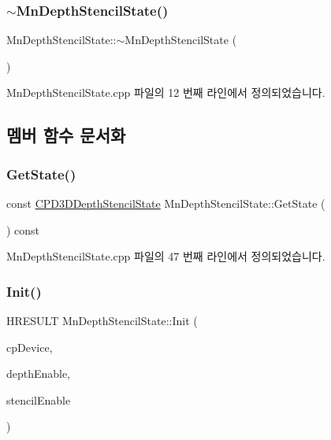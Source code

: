 \subsubsection{\texorpdfstring{$\sim$\+Mn\+Depth\+Stencil\+State()}{~MnDepthStencilState()}}
{\footnotesize\ttfamily Mn\+Depth\+Stencil\+State\+::$\sim$\+Mn\+Depth\+Stencil\+State (\begin{DoxyParamCaption}{ }\end{DoxyParamCaption})}



Mn\+Depth\+Stencil\+State.\+cpp 파일의 12 번째 라인에서 정의되었습니다.



\subsection{멤버 함수 문서화}
\mbox{\label{class_m_n_l_1_1_mn_depth_stencil_state_aceb187c0cf267621b631531cac28bd27}} 
\subsubsection{\texorpdfstring{Get\+State()}{GetState()}}
{\footnotesize\ttfamily const \hyperlink{namespace_m_n_l_a8209b06065c025e5d6bc2e8ee5925faf}{C\+P\+D3\+D\+Depth\+Stencil\+State} Mn\+Depth\+Stencil\+State\+::\+Get\+State (\begin{DoxyParamCaption}{ }\end{DoxyParamCaption}) const}



Mn\+Depth\+Stencil\+State.\+cpp 파일의 47 번째 라인에서 정의되었습니다.

\mbox{\label{class_m_n_l_1_1_mn_depth_stencil_state_a3c269bcb6437435f134cbb1e2e761b0f}} 
\subsubsection{\texorpdfstring{Init()}{Init()}}
{\footnotesize\ttfamily H\+R\+E\+S\+U\+LT Mn\+Depth\+Stencil\+State\+::\+Init (\begin{DoxyParamCaption}\item[{\hyperlink{namespace_m_n_l_a1eec210db8f309a4a9ac0d9658784c31}{C\+P\+D3\+D\+Device}}]{cp\+Device,  }\item[{bool}]{depth\+Enable,  }\item[{bool}]{stencil\+Enable }\end{DoxyParamCaption})}



